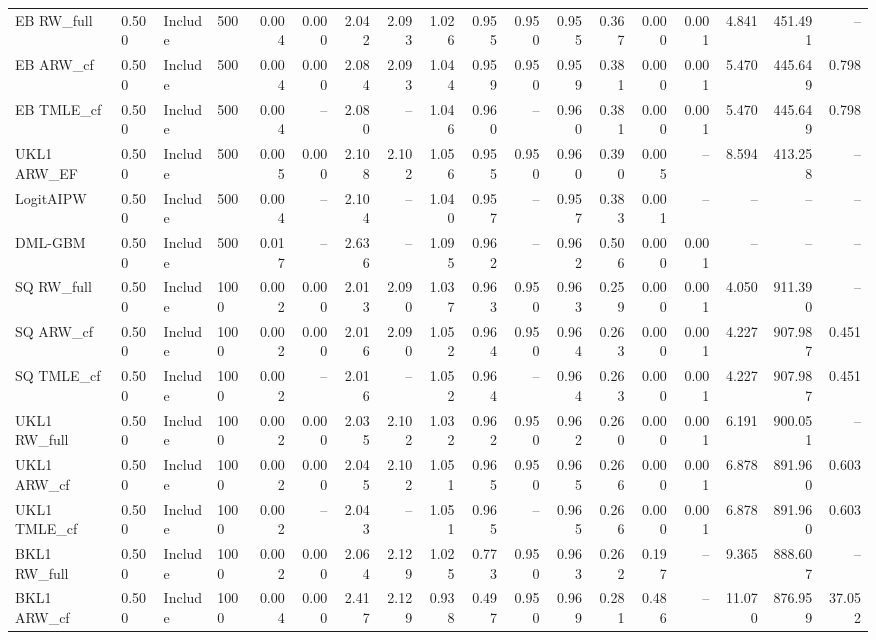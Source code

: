 \begin{tabular}{llllrrrrrrrrrrrrrr}
EB RW\_full & 0.500 & Include & 500 & 0.004 & 0.000 & 2.042 & 2.093 & 1.026 & 0.955 & 0.950 & 0.955 & 0.367 & 0.000 & 0.001 & 4.841 & 451.491 & -- \\
EB ARW\_cf & 0.500 & Include & 500 & 0.004 & 0.000 & 2.084 & 2.093 & 1.044 & 0.959 & 0.950 & 0.959 & 0.381 & 0.000 & 0.001 & 5.470 & 445.649 & 0.798 \\
EB TMLE\_cf & 0.500 & Include & 500 & 0.004 & -- & 2.080 & -- & 1.046 & 0.960 & -- & 0.960 & 0.381 & 0.000 & 0.001 & 5.470 & 445.649 & 0.798 \\
UKL1 ARW\_EF & 0.500 & Include & 500 & 0.005 & 0.000 & 2.108 & 2.102 & 1.056 & 0.955 & 0.950 & 0.960 & 0.390 & 0.005 & -- & 8.594 & 413.258 & -- \\
LogitAIPW & 0.500 & Include & 500 & 0.004 & -- & 2.104 & -- & 1.040 & 0.957 & -- & 0.957 & 0.383 & 0.001 & -- & -- & -- & -- \\
DML-GBM & 0.500 & Include & 500 & 0.017 & -- & 2.636 & -- & 1.095 & 0.962 & -- & 0.962 & 0.506 & 0.000 & 0.001 & -- & -- & -- \\
SQ RW\_full & 0.500 & Include & 1000 & 0.002 & 0.000 & 2.013 & 2.090 & 1.037 & 0.963 & 0.950 & 0.963 & 0.259 & 0.000 & 0.001 & 4.050 & 911.390 & -- \\
SQ ARW\_cf & 0.500 & Include & 1000 & 0.002 & 0.000 & 2.016 & 2.090 & 1.052 & 0.964 & 0.950 & 0.964 & 0.263 & 0.000 & 0.001 & 4.227 & 907.987 & 0.451 \\
SQ TMLE\_cf & 0.500 & Include & 1000 & 0.002 & -- & 2.016 & -- & 1.052 & 0.964 & -- & 0.964 & 0.263 & 0.000 & 0.001 & 4.227 & 907.987 & 0.451 \\
UKL1 RW\_full & 0.500 & Include & 1000 & 0.002 & 0.000 & 2.035 & 2.102 & 1.032 & 0.962 & 0.950 & 0.962 & 0.260 & 0.000 & 0.001 & 6.191 & 900.051 & -- \\
UKL1 ARW\_cf & 0.500 & Include & 1000 & 0.002 & 0.000 & 2.045 & 2.102 & 1.051 & 0.965 & 0.950 & 0.965 & 0.266 & 0.000 & 0.001 & 6.878 & 891.960 & 0.603 \\
UKL1 TMLE\_cf & 0.500 & Include & 1000 & 0.002 & -- & 2.043 & -- & 1.051 & 0.965 & -- & 0.965 & 0.266 & 0.000 & 0.001 & 6.878 & 891.960 & 0.603 \\
BKL1 RW\_full & 0.500 & Include & 1000 & 0.002 & 0.000 & 2.064 & 2.129 & 1.025 & 0.773 & 0.950 & 0.963 & 0.262 & 0.197 & -- & 9.365 & 888.607 & -- \\
BKL1 ARW\_cf & 0.500 & Include & 1000 & 0.004 & 0.000 & 2.417 & 2.129 & 0.938 & 0.497 & 0.950 & 0.969 & 0.281 & 0.486 & -- & 11.070 & 876.959 & 37.052 \\

\end{tabular}
